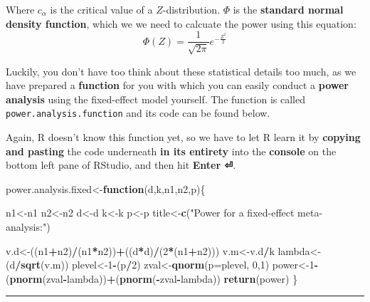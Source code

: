 \documentclass[]{book}
\newenvironment{Shaded}{\begin{snugshade}}{\end{snugshade}}
\newcommand{\KeywordTok}[1]{\textcolor[rgb]{0.13,0.29,0.53}{\textbf{#1}}}
\newcommand{\DataTypeTok}[1]{\textcolor[rgb]{0.13,0.29,0.53}{#1}}
\newcommand{\DecValTok}[1]{\textcolor[rgb]{0.00,0.00,0.81}{#1}}
\newcommand{\StringTok}[1]{\textcolor[rgb]{0.31,0.60,0.02}{#1}}
\newcommand{\ControlFlowTok}[1]{\textcolor[rgb]{0.13,0.29,0.53}{\textbf{#1}}}
\newcommand{\OperatorTok}[1]{\textcolor[rgb]{0.81,0.36,0.00}{\textbf{#1}}}
\newcommand{\NormalTok}[1]{#1}
\theoremstyle{definition}
\theoremstyle{definition}
\theoremstyle{definition}
\theoremstyle{remark}
\begin{document}
Where \(c_{\alpha}\) is the critical value of a \(Z\)-distribution.
\(\Phi\) is the \textbf{standard normal density function}, which we we
need to calcuate the power using this equation:
\[\Phi(Z)=\frac{1}{\sqrt {2\pi}}e^{-\frac{Z^2}{2}}\]

Luckily, you don't have too think about these statistical details too
much, as we have prepared a \textbf{function} for you with which you can
easily conduct a \textbf{power analysis} using the fixed-effect model
yourself. The function is called \texttt{power.analysis.function} and
its code can be found below.

Again, R doesn't know this function yet, so we have to let R learn it by
\textbf{copying and pasting} the code underneath \textbf{in its
entirety} into the \textbf{console} on the bottom left pane of RStudio,
and then hit \textbf{Enter ⏎}.

\begin{Shaded}
\begin{Highlighting}[]
\NormalTok{power.analysis.fixed<-}\ControlFlowTok{function}\NormalTok{(d,k,n1,n2,p)\{}

\NormalTok{  n1<-n1}
\NormalTok{  n2<-n2}
\NormalTok{  d<-d}
\NormalTok{  k<-k}
\NormalTok{  p<-p}
\NormalTok{  title<-}\KeywordTok{c}\NormalTok{(}\StringTok{"Power for a fixed-effect meta-analysis:"}\NormalTok{)}

\NormalTok{  v.d<-((n1}\OperatorTok{+}\NormalTok{n2)}\OperatorTok{/}\NormalTok{(n1}\OperatorTok{*}\NormalTok{n2))}\OperatorTok{+}\NormalTok{((d}\OperatorTok{*}\NormalTok{d)}\OperatorTok{/}\NormalTok{(}\DecValTok{2}\OperatorTok{*}\NormalTok{(n1}\OperatorTok{+}\NormalTok{n2)))}
\NormalTok{  v.m<-v.d}\OperatorTok{/}\NormalTok{k}
\NormalTok{  lambda<-(d}\OperatorTok{/}\KeywordTok{sqrt}\NormalTok{(v.m))}
\NormalTok{  plevel<-}\DecValTok{1}\OperatorTok{-}\NormalTok{(p}\OperatorTok{/}\DecValTok{2}\NormalTok{)}
\NormalTok{  zval<-}\KeywordTok{qnorm}\NormalTok{(}\DataTypeTok{p=}\NormalTok{plevel, }\DecValTok{0}\NormalTok{,}\DecValTok{1}\NormalTok{)}
\NormalTok{  power<-}\DecValTok{1}\OperatorTok{-}\NormalTok{(}\KeywordTok{pnorm}\NormalTok{(zval}\OperatorTok{-}\NormalTok{lambda))}\OperatorTok{+}\NormalTok{(}\KeywordTok{pnorm}\NormalTok{(}\OperatorTok{-}\NormalTok{zval}\OperatorTok{-}\NormalTok{lambda))}
  \KeywordTok{return}\NormalTok{(power)}
\NormalTok{\}}
\end{Highlighting}
\end{Shaded}

\begin{center}\rule{0.5\linewidth}{\linethickness}\end{center}
\end{document}
